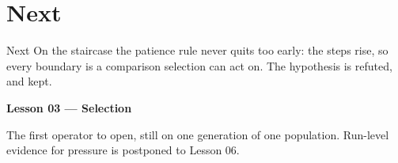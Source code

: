 
\section{Next}

\begin{frame}{Next}
On the staircase the patience rule never quits too early: the steps rise, so every boundary is a comparison selection can act on. The hypothesis is refuted, and kept.

\vspace{0.8em}
\textbf{Lesson 03 --- Selection}

The first operator to open, still on one generation of one population. Run-level evidence for pressure is postponed to Lesson 06.
\end{frame}

